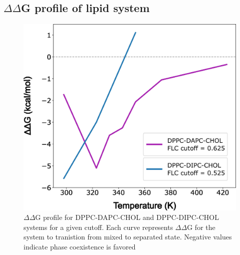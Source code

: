 \documentclass{biophys-new}
\begin{document}
\subsection*{$\Delta\Delta$G profile of lipid system}

\begin{figure}[hbt!]
\centering
\includegraphics[width=0.5\linewidth]{Figures/Main/7/placeholder.jpg}
\caption{$\Delta$$\Delta$G profile for DPPC-DAPC-CHOL and DPPC-DIPC-CHOL systems for a given cutoff. Each curve represents $\Delta$$\Delta$G for the system to tranistion from mixed to separated state. Negative values indicate phase coexistence is favored}
\label{figs7:view}
\end{figure}
\end{document}
